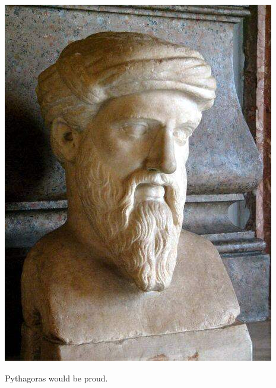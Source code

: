 \documentclass{beamer}
\begin{document}
\begin{frame}
  \centering
  \includegraphics[height=0.7\textheight]{pythagoras}
  \par
  \vspace{4ex}
  Pythagoras would be proud.
\end{frame}
\end{document}
